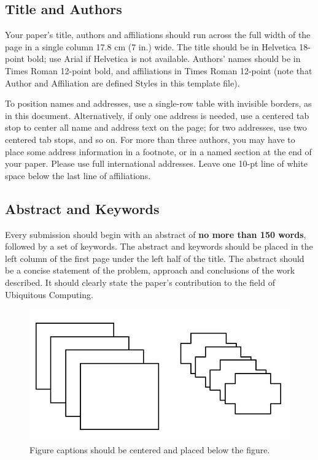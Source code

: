 \documentclass{ubicomp2010}
\begin{document}
\subsection{Title and Authors}

Your paper's title, authors and affiliations should run across the
full width of the page in a single column 17.8 cm (7 in.) wide.  The
title should be in Helvetica 18-point bold; use Arial if Helvetica is
not available.  Authors' names should be in Times Roman 12-point bold,
and affiliations in Times Roman 12-point (note that Author and
Affiliation are defined Styles in this template file).

To position names and addresses, use a single-row table with invisible
borders, as in this document.  Alternatively, if only one address is
needed, use a centered tab stop to center all name and address text on
the page; for two addresses, use two centered tab stops, and so
on. For more than three authors, you may have to place some address
information in a footnote, or in a named section at the end of your
paper. Please use full international addresses.  Leave one 10-pt line of white space below the last line of
affiliations.

\subsection{Abstract and Keywords}

Every submission should begin with an abstract of \textbf{no more than 150 words},
followed by a set of keywords. The abstract and keywords should be
placed in the left column of the first page under the left half of the
title. The abstract should be a concise statement of the problem,
approach and conclusions of the work described.  It should clearly
state the paper's contribution to the field of Ubiquitous Computing.

\begin{figure}[t]
\begin{center}
\includegraphics[width=0.90\columnwidth]{sample-fig.jpg}
\end{center}
\caption{Figure captions should be centered and placed below the
figure.}
\end{figure}
\end{document}
